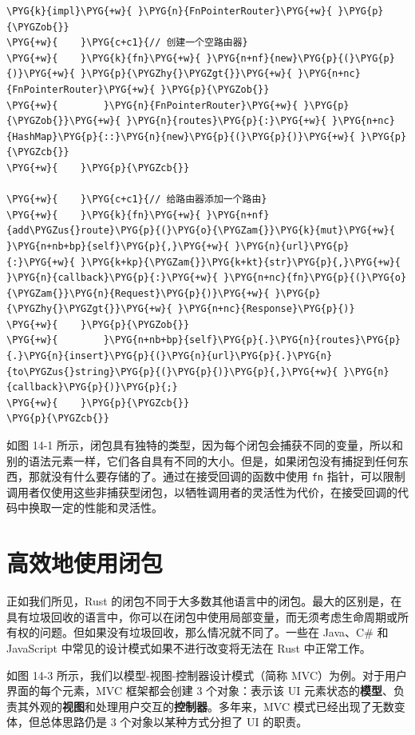 \begin{Verbatim}[commandchars=\\\{\},breaklines=true,breakanywhere=true,fontsize=\codefont,xleftmargin=17bp]
\PYG{k}{impl}\PYG{+w}{ }\PYG{n}{FnPointerRouter}\PYG{+w}{ }\PYG{p}{\PYGZob{}}
\PYG{+w}{    }\PYG{c+c1}{// 创建一个空路由器}
\PYG{+w}{    }\PYG{k}{fn}\PYG{+w}{ }\PYG{n+nf}{new}\PYG{p}{(}\PYG{p}{)}\PYG{+w}{ }\PYG{p}{\PYGZhy{}\PYGZgt{}}\PYG{+w}{ }\PYG{n+nc}{FnPointerRouter}\PYG{+w}{ }\PYG{p}{\PYGZob{}}
\PYG{+w}{        }\PYG{n}{FnPointerRouter}\PYG{+w}{ }\PYG{p}{\PYGZob{}}\PYG{+w}{ }\PYG{n}{routes}\PYG{p}{:}\PYG{+w}{ }\PYG{n+nc}{HashMap}\PYG{p}{::}\PYG{n}{new}\PYG{p}{(}\PYG{p}{)}\PYG{+w}{ }\PYG{p}{\PYGZcb{}}
\PYG{+w}{    }\PYG{p}{\PYGZcb{}}

\PYG{+w}{    }\PYG{c+c1}{// 给路由器添加一个路由}
\PYG{+w}{    }\PYG{k}{fn}\PYG{+w}{ }\PYG{n+nf}{add\PYGZus{}route}\PYG{p}{(}\PYG{o}{\PYGZam{}}\PYG{k}{mut}\PYG{+w}{ }\PYG{n+nb+bp}{self}\PYG{p}{,}\PYG{+w}{ }\PYG{n}{url}\PYG{p}{:}\PYG{+w}{ }\PYG{k+kp}{\PYGZam{}}\PYG{k+kt}{str}\PYG{p}{,}\PYG{+w}{ }\PYG{n}{callback}\PYG{p}{:}\PYG{+w}{ }\PYG{n+nc}{fn}\PYG{p}{(}\PYG{o}{\PYGZam{}}\PYG{n}{Request}\PYG{p}{)}\PYG{+w}{ }\PYG{p}{\PYGZhy{}\PYGZgt{}}\PYG{+w}{ }\PYG{n+nc}{Response}\PYG{p}{)}
\PYG{+w}{    }\PYG{p}{\PYGZob{}}
\PYG{+w}{        }\PYG{n+nb+bp}{self}\PYG{p}{.}\PYG{n}{routes}\PYG{p}{.}\PYG{n}{insert}\PYG{p}{(}\PYG{n}{url}\PYG{p}{.}\PYG{n}{to\PYGZus{}string}\PYG{p}{(}\PYG{p}{)}\PYG{p}{,}\PYG{+w}{ }\PYG{n}{callback}\PYG{p}{)}\PYG{p}{;}
\PYG{+w}{    }\PYG{p}{\PYGZcb{}}
\PYG{p}{\PYGZcb{}}
\end{Verbatim}

如图 14-1 所示，闭包具有独特的类型，因为每个闭包会捕获不同的变量，所以和别的语法元素一样，它们各自具有不同的大小。但是，如果闭包没有捕捉到任何东西，那就没有什么要存储的了。通过在接受回调的函数中使用 \texttt{fn} 指针，可以限制调用者仅使用这些非捕获型闭包，以牺牲调用者的灵活性为代价，在接受回调的代码中换取一定的性能和灵活性。

\section{高效地使用闭包}

正如我们所见，Rust 的闭包不同于大多数其他语言中的闭包。最大的区别是，在具有垃圾回收的语言中，你可以在闭包中使用局部变量，而无须考虑生命周期或所有权的问题。但如果没有垃圾回收，那么情况就不同了。一些在 Java、C\# 和 JavaScript 中常见的设计模式如果不进行改变将无法在 Rust 中正常工作。

如图 14-3 所示，我们以模型-视图-控制器设计模式（简称 MVC）为例。对于用户界面的每个元素，MVC 框架都会创建 3 个对象：表示该 UI 元素状态的\textbf{模型}、负责其外观的\textbf{视图}和处理用户交互的\textbf{控制器}。多年来，MVC 模式已经出现了无数变体，但总体思路仍是 3 个对象以某种方式分担了 UI 的职责。

